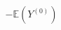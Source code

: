 \documentclass[preview]{standalone}
\begin{document}
\begin{align*}
-  \mathbb{E}(Y^{(0)})
\end{align*}
\end{document}

